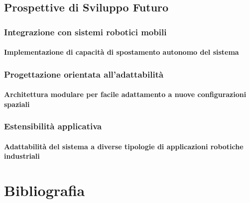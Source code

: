 \documentclass[12pt,a4paper,twoside,openright]{book}
\begin{document}
	\section{Prospettive di Sviluppo Futuro}
	\subsection{Integrazione con sistemi robotici mobili}
	\subsubsection{Implementazione di capacità di spostamento autonomo del sistema}
	\subsection{Progettazione orientata all'adattabilità}
	\subsubsection{Architettura modulare per facile adattamento a nuove configurazioni spaziali}
	\subsection{Estensibilità applicativa}
	\subsubsection{Adattabilità del sistema a diverse tipologie di applicazioni robotiche industriali}
	

	\chapter*{Bibliografia}
	
	\listoffigures
	
	\listoftables
	
\end{document}
